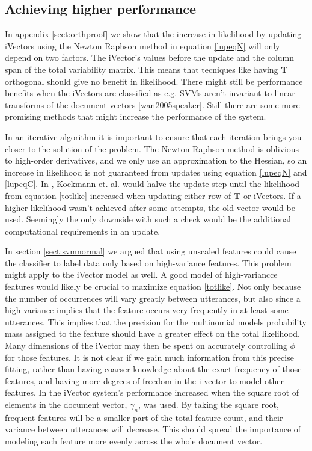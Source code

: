 \subsection{Achieving higher performance}
\label{sect:higherlike}

In appendix \ref{sect:orthproof} we show that the increase in likelihood by updating iVectors using the Newton Raphson method in equation \ref{lupeqN} will only depend on two factors. The iVector's values before the update and the column span of the total variability matrix. This means that tecniques like having $\mathbf{T}$ orthogonal should give no benefit in likelihood. There might still be performance benefits when the iVectors are classified as e.g. SVMs aren't invariant to linear transforms of the document vectors \ref{wan2005speaker}. Still there are some more promising methods that might increase the performance of the system.

In an iterative algorithm it is important to ensure that each iteration brings you closer to the solution of the problem. The Newton Raphson method is oblivious to high-order derivatives, and we only use an approximation to the Hessian, so an increase in likelihood is not guaranteed from updates using equation \ref{lupeqN} and \ref{lupeqC}. In \cite{kockmann2010prosodic}, Kockmann et. al. would halve the update step until the likelihood from equation \ref{totlike} increased when updating either row of $\mathbf{T}$ or iVectors. If a higher likelihood wasn't achieved after some attempts, the old vector would be used.  Seemingly the only downside with such a check would be the additional computational requirements in an update.

In section \ref{sect:svmnormal} we argued that using unscaled features could cause the classifier to label data only based on high-variance features. This problem might apply to the iVector model as well. A good model of high-variancce features would likely be crucial to maximize equation \ref{totlike}. Not only because the number of occurrences will vary greatly between utterances, but also since a high variance implies that the feature occurs very frequently in at least some utterances. This implies that the precision for the multinomial models probability mass assigned to the feature should have a greater effect on the total likelihood. Many dimensions of the iVector may then be spent on accurately controlling $\phi$ for those features. It is not clear if we gain much information from this precise fitting, rather than having coarser knowledge about the exact frequency of those features, and having more degrees of freedom in the i-vector to model other features. In \cite{soufifar2011ivector} the iVector system's performance increased when the square root of elements in the document vector, $\gamma_n$, was used. By taking the square root, frequent features will be a smaller part of the total feature count, and their variance between utterances will decrease. This should spread the importance of modeling each feature more evenly across the whole document vector.

